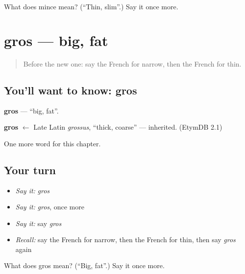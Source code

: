 \begin{tcolorbox}[breakable,colback=teal!4,colframe=teal!35!black,title={Before you move on}]
What does mince mean? (\textquotedblleft{}Thin, slim\textquotedblright{}.) Say it once more.
\end{tcolorbox}
\section[gros]{gros — big, fat}

\label{lesson:FR-C93-gros}



\begin{quote}
Before the new one: say the French for narrow, then the French for thin.
\end{quote}

\subsection*{You'll want to know: gros}
\textbf{gros} — \textquotedblleft{}big, fat\textquotedblright{}.

\begin{cousinweb}
\textbf{gros} $\leftarrow$ Late Latin \emph{grossus}, \textquotedblleft{}thick, coarse\textquotedblright{} — inherited. (EtymDB 2.1)
\end{cousinweb}

\begin{grammarlens}[title={What you've built}]
One more word for this chapter.
\end{grammarlens}

\subsection*{Your turn}
\begin{itemize}
\raggedright
  \item \emph{Say it:} \emph{gros}
  \item \emph{Say it:} \emph{gros}, once more
  \item \emph{Say it:} say \emph{gros}
  \item \emph{Recall:} say the French for narrow, then the French for thin, then say \emph{gros} again
\end{itemize}

\begin{tcolorbox}[breakable,colback=teal!4,colframe=teal!35!black,title={Before you move on}]
What does gros mean? (\textquotedblleft{}Big, fat\textquotedblright{}.) Say it once more.
\end{tcolorbox}

